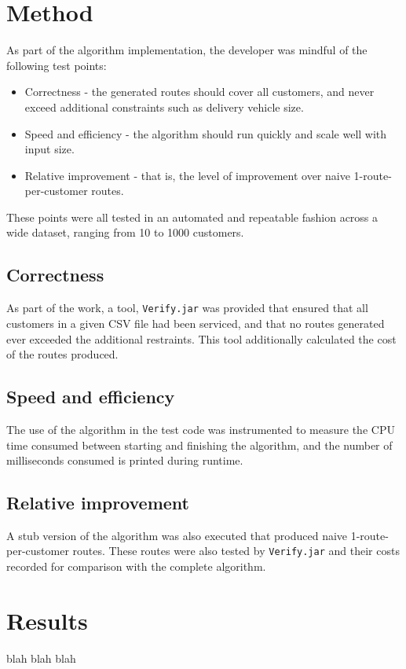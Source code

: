 \documentclass[a4paper]{article}
\begin{document}
    \section{Method}
    As part of the algorithm implementation, the developer was mindful of the following test points:
    \begin{itemize}
        \item Correctness - the generated routes should cover all customers, and never exceed additional constraints such as delivery vehicle size.
        \item Speed and efficiency - the algorithm should run quickly and scale well with input size.
        \item Relative improvement - that is, the level of improvement over naive 1-route-per-customer routes.
    \end{itemize}
    These points were all tested in an automated and repeatable fashion across a wide dataset, ranging from 10 to 1000 customers.

        \subsection{Correctness}
        As part of the work, a tool, \texttt{Verify.jar} was provided that ensured that all customers in a given CSV file had been serviced, and that no
        routes generated ever exceeded the additional restraints. This tool additionally calculated the cost of the routes produced.

        \subsection{Speed and efficiency}
        The use of the algorithm in the test code was instrumented to measure the CPU time consumed between starting and finishing the algorithm,
        and the number of milliseconds consumed is printed during runtime.

        \subsection{Relative improvement}
        A stub version of the algorithm was also executed that produced naive 1-route-per-customer routes. These routes were also tested by \texttt{Verify.jar}
        and their costs recorded for comparison with the complete algorithm.
    

    \section{Results}
    blah blah blah
\end{document}
